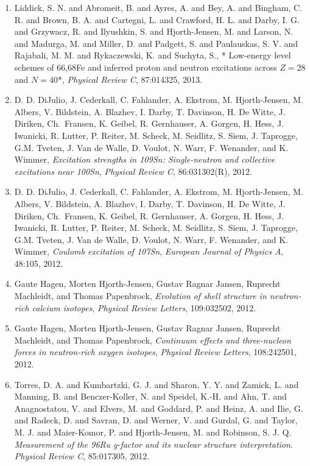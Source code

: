 \documentclass[%
oneside,                 %
final,                   %
10pt]{article}
\begin{document}
\begin{enumerate}
\item Liddick, S. N. and Abromeit, B. and Ayres, A. and Bey, A. and Bingham, C. R. and Brown, B. A. and Cartegni, L. and Crawford, H. L. and Darby, I. G. and Grzywacz, R. and Ilyushkin, S. and Hjorth-Jensen, M. and Larson, N. and Madurga, M. and Miller, D. and Padgett, S. and Paulauskas, S. V. and Rajabali, M. M. and Rykaczewski, K. and Suchyta, S.,  * Low-energy level schemes of 66,68Fe and inferred proton and neutron excitations across $Z=28$ and $N=40$*,   \emph{Physical Review C},  87:014325, 2013.  

\item D. D. DiJulio, J. Cederkall, C. Fahlander, A. Ekstrom, M. Hjorth-Jensen, M. Albers, V. Bildstein, A. Blazhev, I. Darby, T. Davinson, H. De Witte, J. Diriken, Ch.~Fransen, K. Geibel, R. Gernhauser, A. Gorgen, H. Hess, J. Iwanicki, R. Lutter, P. Reiter, M. Scheck, M. Seidlitz, S. Siem, J. Taprogge, G.M. Tveten, J. Van de Walle, D. Voulot, N. Warr, F. Wenander, and K. Wimmer,  \emph{Excitation strengths in 109Sn: Single-neutron and collective excitations near 100Sn},   \emph{Physical Review C},  86:031302(R), 2012. 

\item D. D. DiJulio, J. Cederkall, C. Fahlander, A. Ekstrom, M. Hjorth-Jensen, M. Albers, V. Bildstein, A. Blazhev, I. Darby, T. Davinson, H. De Witte, J. Diriken, Ch.~Fransen, K. Geibel, R. Gernhauser, A. Gorgen, H. Hess, J. Iwanicki, R. Lutter, P. Reiter, M. Scheck, M. Seidlitz, S. Siem, J. Taprogge, G.M. Tveten, J. Van de Walle, D. Voulot, N. Warr, F. Wenander, and K. Wimmer,  \emph{Coulomb excitation of 107Sn},   \emph{European Journal of Physics A}, 48:105,  2012.  

\item Gaute Hagen, Morten Hjorth-Jensen, Gustav Ragnar Jansen, Ruprecht Machleidt, and Thomas Papenbrock, \emph{Evolution of shell structure in neutron-rich calcium isotopes},   \emph{Physical Review Letters}, 109:032502, 2012. 

\item Gaute Hagen, Morten Hjorth-Jensen, Gustav Ragnar Jansen, Ruprecht Machleidt, and Thomas Papenbrock, \emph{Continuum effects and three-nucleon forces in neutron-rich  oxygen isotopes},   \emph{Physical Review Letters}, 108:242501, 2012.  

\item Torres, D. A. and Kumbartzki, G. J. and Sharon, Y. Y. and Zamick, 	L. and Manning, B. and Benczer-Koller, N. and Speidel, K.-H. and 	Ahn, T. and Anagnostatou, V. and Elvers, M. and Goddard, P. and Heinz, 	A. and Ilie, G. and Radeck, D. and Savran, D. and Werner, V. and 	Gurdal, G. and Taylor, M. J. and Maier-Komor, P. and Hjorth-Jensen, 	M. and Robinson, S. J. Q.  \emph{Measurement of the 96Ru g-factor and its nuclear structure interpretation}.  \emph{Physical Review C}, 85:017305, 2012.  


\end{enumerate}
\end{document}
